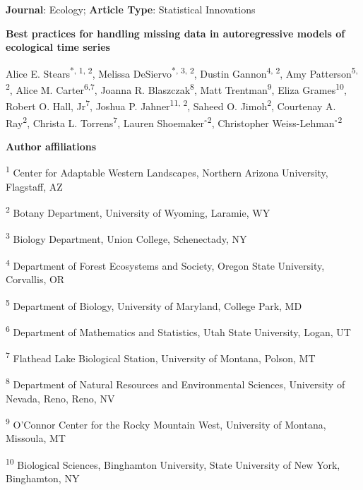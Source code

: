 \documentclass[12pt,english]{article} %
\begin{document}
\noindent\textbf{Journal}: Ecology; \textbf{Article Type}: Statistical Innovations

{\large \noindent \bf %
Best practices for handling missing data in autoregressive models of ecological time series
}


\medskip

\noindent Alice E. Stears\textsuperscript{*, 1, 2}, 
Melissa DeSiervo\textsuperscript{*, 3, 2},
Dustin Gannon\textsuperscript{4, 2},
Amy Patterson\textsuperscript{5, 2},
Alice M. Carter\textsuperscript{6,7},
Joanna R. Blaszczak\textsuperscript{8},
Matt Trentman\textsuperscript{9},
Eliza Grames\textsuperscript{10},
Robert O. Hall, Jr\textsuperscript{7},
Joshua P. Jahner\textsuperscript{11, 2},
Saheed O. Jimoh\textsuperscript{2},
Courtenay A. Ray\textsuperscript{2},
Christa L. Torrens\textsuperscript{7},
Lauren Shoemaker$^{\circ}$\textsuperscript{2},
Christopher Weiss-Lehman$^{\circ}$\textsuperscript{2}

\noindent\noindent \textbf{Author affiliations}

\noindent\textsuperscript{1} Center for Adaptable Western Landscapes, Northern Arizona University, Flagstaff, AZ

\noindent\textsuperscript{2} Botany Department, University of Wyoming, Laramie, WY

\noindent\textsuperscript{3} Biology Department, Union College, Schenectady, NY

\noindent\textsuperscript{4} Department of Forest Ecosystems and Society, Oregon State University, Corvallis, OR 

\noindent\textsuperscript{5} Department of Biology, University of Maryland, College Park, MD

\noindent\textsuperscript{6} Department of Mathematics and Statistics, Utah State University, Logan, UT

\noindent\textsuperscript{7} Flathead Lake Biological Station, University of Montana, Polson, MT

\noindent\textsuperscript{8} Department of Natural Resources and Environmental Sciences, University of Nevada, Reno, Reno, NV

\noindent\textsuperscript{9} O’Connor Center for the Rocky Mountain West, University of Montana, Missoula, MT

\noindent\textsuperscript{10} Biological Sciences, Binghamton University, State University of New York, Binghamton, NY
\end{document}
